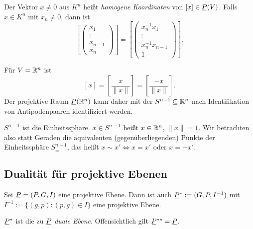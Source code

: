 \begin{deno*}
 Der Vektor $x \ne 0$ aus $K^n$ heißt \emph{homogene Koordinaten} von $[x] \in \proj(V)$. Falls $x \in K^n$ mit $x_n \ne 0$, dann ist
 \[ \left[ \begin{pmatrix} x_1 \\ \vdots \\ x_{n-1} \\ x_n \end{pmatrix} \right] =
    \left[ \begin{pmatrix} x_n^{-1} x_1 \\ \vdots \\ x_n^{-1} x_{n-1} \\ 1 \end{pmatrix} \right]. \]
\end{deno*}

Für $V = \mathbb{R}^n$ ist
\[ [x] = \left[ \frac{x}{\|x\|} \right] = \left[ \frac{-x}{\|x\|} \right]. \]
Der projektive Raum $\proj(\real^n)$ kann daher mit der $S^{n-1} \subseteq \mathbb{R}^n$ nach Identifikation von Antipodenpaaren identifiziert werden.
 
$S^{n-1}$ ist die Einheitssphäre. $x \in S^{n-1}$ heißt $x \in \mathbb{R}^n$, $\| x \| = 1$. Wir betrachten also statt Geraden die äquivalenten (gegenüberliegenden) Punkte der Einheitssphäre $S^{n-1}_\pm$, das heißt $x \sim x' \Leftrightarrow x = x'$ oder $x = -x'$.

\subsection{Dualität für projektive Ebenen}
\begin{thm}
 Sei $\proj = (P,G,I)$ eine projektive Ebene. Dann ist auch $\proj^* := (G,P,I^{-1})$ mit $I^{-1} := \{ (g,p) : (p,g) \in I \}$ eine projektive Ebene.
\end{thm}

$\proj^*$ ist die zu $\proj$ \emph{duale Ebene}. Offensichtlich gilt $\proj^{**} = \proj$.


